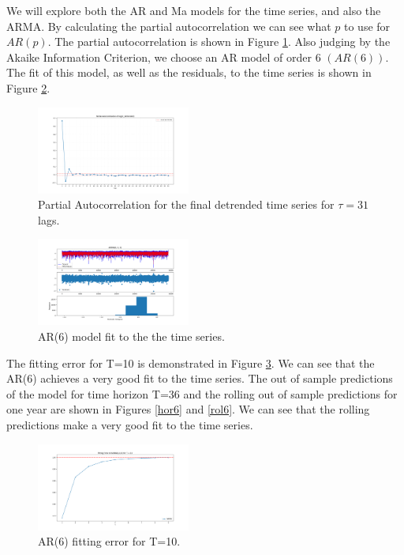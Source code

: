 \documentclass[conference]{IEEEtran}
\begin{document}
We will explore both the AR and Ma models for the time series, and also the ARMA. By calculating the partial autocorrelation we can see what $p$ to use for $AR(p)$. The partial autocorrelation is shown in Figure \ref{airfddts}. Also judging by the Akaike Information Criterion, we choose an AR model of order $6$ $(AR(6))$. The fit of this model, as well as the residuals, to the time series is shown in Figure \ref{ar6}.
\vspace{7mm}

\begin{figure}[ht]
    \centering
    \includegraphics[width=0.45\textwidth]{Figures/Partial Autocorrelation of log(X_detrended).png}
    \caption{Partial Autocorrelation for the final detrended time series for $\tau = 31$ lags.}
    \label{airfddts}
\end{figure}

\begin{figure}[ht]
    \centering
    \includegraphics[width=0.45\textwidth]{Figures/ARIMA(6,0,0).png}
    \caption{AR(6) model fit to the the time series.}
    \label{ar6}
\end{figure}

The fitting error for T=10 is demonstrated in Figure \ref{fe6}. We can see that the AR(6) achieves a very good fit to the time series. The out of sample predictions of the model for time horizon T=36 and the rolling out of sample predictions for one year are shown in Figures \ref{hor6} and \ref{rol6}. We can see that the rolling predictions make a very good fit to the time series. 

\begin{figure}[ht]
    \centering
    \includegraphics[width=0.45\textwidth]{Figures/Fitting Error of ARIMA(6,0,0) for T = 10.png}
    \caption{AR(6) fitting error for T=10.}
    \label{fe6}
\end{figure}
\end{document}
